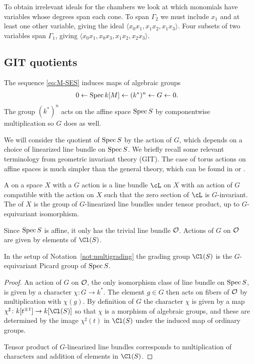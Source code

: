\documentclass{article}
\begin{document}
\begin{example}
  To obtain irrelevant ideals for the chambers we look at which monomials have variables whose degrees span each cone.  To span $\Gamma_2$ we must include $x_1$ and at least one other variable, giving the ideal $\langle x_0x_1,x_1x_2,x_1x_3\rangle$.  Four subsets of two variables span $\Gamma_1$, giving $\langle x_0x_1, x_0x_3, x_1x_2, x_2x_3\rangle$.
\end{example}

\subsection{GIT quotients}\label{sec:variation-of-GIT}
The sequence \eqref{eq:M-SES} induces maps of algebraic groups
\begin{align}\label{eq:alg-SES}
  0\gets \operatorname{Spec} k[M]\gets (k^*)^n\gets G\gets 0.
\end{align}
The group $(k^*)^n$ acts on the affine space $\operatorname{Spec} S$ by componentwise multiplication so $G$ does as well.

We will consider the quotient of $\operatorname{Spec} S$ by the action of $G$, which depends on a choice of linearized line bundle on $\operatorname{Spec} S$.  We briefly recall some relevant terminology from geometric invariant theory (GIT).  The case of torus actions on affine spaces is much simpler than the general theory, which can be found in \cite{Mumford1965} or \cite{Dolgachev2003}.

\begin{defn}
  A  on a space $X$ with a $G$ action is a line bundle $\cL$ on $X$ with an action of $G$ compatible with the action on $X$ such that the zero section of $\cL$ is $G$-invariant.  The  of $X$ is the group of $G$-linearized line bundles under tensor product, up to $G$-equivariant isomorphism.
\end{defn}

Since $\operatorname{Spec} S$ is affine, it only has the trivial line bundle ${\mathcal O}$.  Actions of $G$ on ${\mathcal O}$ are given by elements of $\Cl(S)$.

\begin{prop}\label{prop:eq-Picard-gp}
  In the setup of Notation~\ref{not:multigrading} the grading group $\Cl(S)$ is the $G$-equivariant Picard group of $\operatorname{Spec} S$.
\end{prop}

\begin{proof}
  An action of $G$ on ${\mathcal O}$, the only isomorphism class of line bundle on $\operatorname{Spec} S$, is given by a character $\chi\colon G\to k^*$.  The element $g\in G$ then acts on fibers of ${\mathcal O}$ by multiplication with $\chi(g)$.  By definition of $G$ the character $\chi$ is given by a map $\chi^\sharp\colon k[t^{\pm 1}]\to k[\Cl(S)]$ so that $\chi$ is a morphism of algebraic groups, and these are determined by the image $\chi^\sharp(t)$ in $\Cl(S)$ under the induced map of ordinary groups.

  Tensor product of $G$-linearized line bundles corresponds to multiplication of characters and addition of elements in $\Cl(S)$.
\end{proof}
\end{document}
